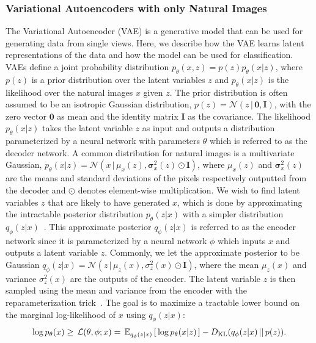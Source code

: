 \subsubsection{Variational Autoencoders with only Natural Images}
\label{paperB:sec:vae_with_only_natural_images}
The Variational Autoencoder (VAE) is a generative model that can be used for generating data from single views. Here, we describe how the VAE learns latent representations of the data and how the model can be used for classification.
VAEs define a joint probability distribution $p_{\theta}(x,z) = p(z) p_{\theta}(x|z)$, where $p(z)$ is a prior distribution over the latent variables $z$ and $p_{\theta}(x|z)$ is the likelihood over the natural images $x$ given $z$. The prior distribution is often assumed to be an isotropic Gaussian distribution, $p(z) = \mathcal{N}(z\,|\, \boldsymbol{0}, \mathbf{I})$, with the zero vector $\boldsymbol{0}$ as mean and the identity matrix $\mathbf{I}$ as the covariance.  
The likelihood $p_{\theta}(x|z)$ takes the latent variable $z$ as input and outputs a distribution parameterized by a neural network with parameters $\theta$
which is referred to as the decoder network.
A common distribution for natural images is a multivariate Gaussian, $p_{\theta}(x|z) = \mathcal{N}(x\,|\, \mu_{x}(z), \bm{\sigma}_{x}^2(z) \odot \mathbf{I})$, where $\mu_{x}(z)$ and $\bm{\sigma}_{x}^2(z)$ are the means and standard deviations of the pixels respectively outputted from the decoder and $\odot$ denotes element-wise multiplication. 
We wish to find latent variables $z$ that are likely to have generated $x$, which is done by approximating the intractable posterior distribution $p_{\theta}(z|x)$ with a simpler distribution $q_{\phi}(z|x)$~. This approximate posterior $q_{\phi}(z|x)$ is referred to as the encoder network since it is parameterized by a neural network $\phi$ which inputs $x$ and outputs a latent variable $z$. Commonly, we let the approximate posterior to be Gaussian
$q_{\phi}(z|x) = \mathcal{N}(z \,|\,\mu_{z}(x), \sigma_{z}^2(x) \odot \mathbf{I})$, where the mean $\mu_{z}(x)$ and variance $\sigma_{z}^2(x)$ are the outputs of the encoder. The latent variable $z$ is then sampled using the mean and variance from the encoder with the reparameterization trick~. The goal is to maximize a tractable lower bound on the marginal log-likelihood of $x$ using $q_{\phi}(z|x)$:
\begin{align}
\begin{split}\label{eq:vae-loss}
\log p_{\theta}(x) \geq \, \mathcal{L}(\theta, \phi; x) = \, \mathbb{E}_{q_{\phi}(z|x)}\left[\, \log p_{\theta}(x | z) \,\right]  -D_{\mathrm{KL}}(q_{\phi}(z|x)\,||\,p(z)) .
\end{split}
\end{align}
